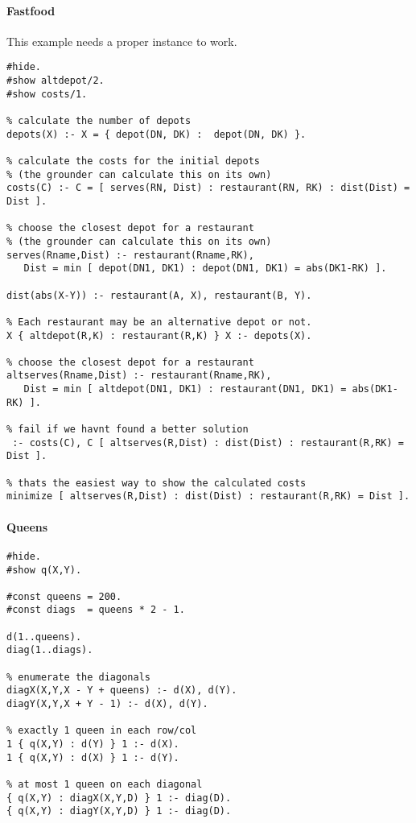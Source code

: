 \documentclass[a4paper,10pt]{article}
\begin{document}
\paragraph{Fastfood}
This example needs a proper instance to work.
\begin{verbatim}
#hide.
#show altdepot/2.
#show costs/1.

% calculate the number of depots
depots(X) :- X = { depot(DN, DK) :  depot(DN, DK) }.

% calculate the costs for the initial depots
% (the grounder can calculate this on its own)
costs(C) :- C = [ serves(RN, Dist) : restaurant(RN, RK) : dist(Dist) = Dist ].

% choose the closest depot for a restaurant
% (the grounder can calculate this on its own)
serves(Rname,Dist) :- restaurant(Rname,RK),
   Dist = min [ depot(DN1, DK1) : depot(DN1, DK1) = abs(DK1-RK) ].

dist(abs(X-Y)) :- restaurant(A, X), restaurant(B, Y).

% Each restaurant may be an alternative depot or not.
X { altdepot(R,K) : restaurant(R,K) } X :- depots(X).

% choose the closest depot for a restaurant
altserves(Rname,Dist) :- restaurant(Rname,RK),
   Dist = min [ altdepot(DN1, DK1) : restaurant(DN1, DK1) = abs(DK1-RK) ].

% fail if we havnt found a better solution
 :- costs(C), C [ altserves(R,Dist) : dist(Dist) : restaurant(R,RK) = Dist ].

% thats the easiest way to show the calculated costs
minimize [ altserves(R,Dist) : dist(Dist) : restaurant(R,RK) = Dist ].
\end{verbatim}

\paragraph{Queens}
\begin{verbatim}
#hide.
#show q(X,Y).

#const queens = 200.
#const diags  = queens * 2 - 1.

d(1..queens).
diag(1..diags).

% enumerate the diagonals
diagX(X,Y,X - Y + queens) :- d(X), d(Y).
diagY(X,Y,X + Y - 1) :- d(X), d(Y).

% exactly 1 queen in each row/col
1 { q(X,Y) : d(Y) } 1 :- d(X).
1 { q(X,Y) : d(X) } 1 :- d(Y).

% at most 1 queen on each diagonal
{ q(X,Y) : diagX(X,Y,D) } 1 :- diag(D).
{ q(X,Y) : diagY(X,Y,D) } 1 :- diag(D).

\end{verbatim}
\end{document}
